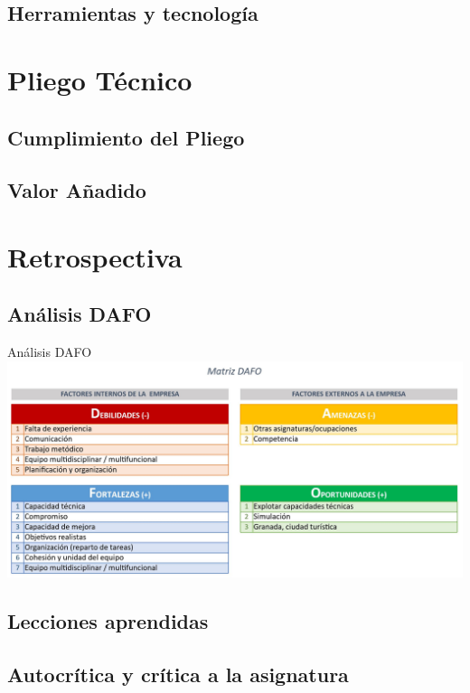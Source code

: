 \documentclass{beamer}
\begin{document}
\subsection{Herramientas y tecnolog\'ia}

\section{Pliego T\'ecnico}

\subsection{Cumplimiento del Pliego}

\subsection{Valor A\~nadido}

\section{Retrospectiva}

\subsection{An\'alisis DAFO}

\begin{frame}{An\'alisis DAFO}
	\includegraphics[width=0.8\paperwidth, height=0.8\paperheight]{images_latex/DAFO}
	  
\end{frame}

\subsection{Lecciones aprendidas}

\subsection{Autocr\'itica y cr\'itica a la asignatura}
\end{document}
